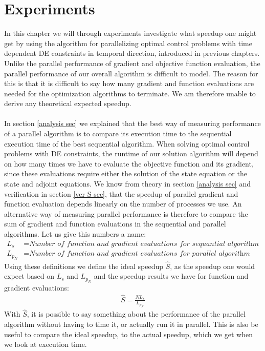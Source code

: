 \chapter{Experiments}\label{Experiments chapter}
In this chapter we will through experiments investigate what speedup one might get by using the algorithm for parallelizing optimal control problems with  time dependent DE constraints in temporal direction, introduced in previous chapters. Unlike the parallel performance of gradient and objective function evaluation, the parallel performance of our overall algorithm is difficult to model. The reason for this is that it is difficult to say how many gradient and function evaluations are needed for the optimization algorithms to terminate. We am therefore unable to derive any theoretical expected speedup.
\\
\\
In section \ref{analysis sec} we explained that the best way of measuring performance of a parallel algorithm is to compare its execution time to the sequential execution time of the best sequential algorithm. When solving optimal control problems with DE constraints, the runtime of our solution algorithm will depend on how many times we have to evaluate the objective function and its gradient, since these evaluations require either the solution of the state equation or the state and adjoint equations. We know from theory in section \ref{analysis sec} and verification in section \ref{ver S sec}, that the speedup of parallel gradient and function evaluation depends linearly on the number of processes we use. An alternative way of measuring parallel performance is therefore to compare the sum of gradient and function evaluations in the sequential and parallel algorithms. Let us give this numbers a name:
\begin{align*}
L_s &= \textit{Number of function and gradient evaluations for sequantial algorithm}\\
L_{p_N} &= \textit{Number of function and gradient evaluations for parallel algorithm using N processes}
\end{align*} 
Using these definitions we define the ideal speedup $\hat{S}$, as the speedup one would expect based on $L_s$ and $L_{p_N}$ and the speedup results we have for function and gradient evaluations:
\begin{align}
\hat S = \frac{NL_s}{L_{p_N}} \label{ideal S}
\end{align}
With $\hat S$, it is possible to say something about the performance of the parallel algorithm without having to time it, or actually run it in parallel. This is also be useful to compare the ideal speedup, to the actual speedup, which we get when we look at execution time.
